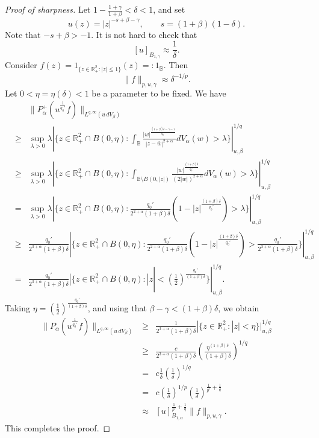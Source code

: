 \documentclass[a4paper,11pt,intlimits,oneside]{amsart}
\theoremstyle{definition}
\numberwithin{equation}{section}
\theoremstyle{definition}
\newcommand{\Beas}{\begin{eqnarray*}}
\newcommand{\Eeas}{\end{eqnarray*}}
\begin{document}
\begin{proof}[Proof of sharpness]
Let $1-\frac{1+\gamma}{1+\beta}<\delta<1$, and set $$u(z)=|z|^{-s+\beta-\gamma}, \qquad s=(1+\beta)(1-\delta).$$
Note that $-s+\beta>-1$. It is not hard to check that
$$[u]_{B_{1,\gamma}}\approx \frac{1}{\delta}.$$
Consider $f(z)=1_{\{z\in \mathbb{R}_+^2:|z|\leq 1\}}(z)=:1_{\mathbb{B}}$. Then
$$\|f\|_{p,u,\gamma}\approx \delta^{-1/p}.$$
Let $0<\eta=\eta(\delta)<1$ be a parameter to be fixed. We have
\Beas
&& \|P_{\alpha}^+(u^{\frac{1}{q_0'}}f)\|_{L^{q,\infty}(u\,{d}V_{\beta})}\\ &\ge& \sup_{\lambda>0}\lambda|\{z\in \mathbb{R}_+^2\cap B(0,\eta):\int_{\mathbb{B}}\frac{|w|^{\frac{(1+\beta)\delta-\gamma-1}{q_0'}}}{|z-\bar{w}|^{2+\alpha}}dV_\alpha(w)>\lambda\}|_{u,\beta}^{1/q}\\ &\ge&  \sup_{\lambda>0}\lambda|\{z\in \mathbb{R}_+^2\cap B(0,\eta):\int_{\mathbb{B}\setminus B(0,|z|)}\frac{|w|^{\frac{(1+\beta)\delta}{q_0'}}}{(2|{w}|)^{2+\alpha}}dV_\alpha(w)>\lambda\}|_{u,\beta}^{1/q}\\ &=& \sup_{\lambda>0}\lambda|\{z\in \mathbb{R}_+^2\cap B(0,\eta):\frac{q_0'}{2^{2+\alpha}(1+\beta)\delta}(1-|z|^{\frac{(1+\beta)\delta}{q_0'}})>\lambda\}|_{u,\beta}^{1/q}\\ &\ge& \frac{q_0'}{2^{3+\alpha}(1+\beta)\delta}|\{z\in \mathbb{R}_+^2\cap B(0,\eta):\frac{q_0'}{2^{2+\alpha}(1+\beta)\delta}(1-|z|^{\frac{(1+\beta)\delta}{q_0'}})>\frac{q_0'}{2^{3+\alpha}(1+\beta)\delta}\}|_{u,\beta}^{1/q}\\ &=& \frac{q_0'}{2^{3+\alpha}(1+\beta)\delta}|\{z\in \mathbb{R}_+^2\cap B(0,\eta):|z|<\left(\frac{1}{2}\right)^{\frac{q_0'}{(1+\beta)\delta}}\}|_{u,\beta}^{1/q}.
\Eeas
Taking $\eta=\left(\frac{1}{2}\right)^{\frac{q_0'}{(1+\beta)\delta}}$, and using that $\beta-\gamma<(1+\beta)\delta$, we obtain
\Beas\|P_{\alpha}(u^{\frac{1}{q_0'}}f)\|_{L^{q,\infty}(u\,{d}V_{\beta})} &\ge& \frac{1}{2^{3+\alpha}(1+\beta)\delta}|\{z\in \mathbb{R}_+^2: |z|<\eta\}|_{u,\beta}^{1/q}\\ &\geq&
\frac{c}{2^{3+\alpha}(1+\beta)\delta}\left(\frac{\eta^{(1+\beta)\delta}}{(1+\beta)\delta}\right)^{1/q}\\ &=& c\frac{1}{\delta}\left(\frac{1}{\delta}\right)^{1/q}\\
&=& c\left(\frac{1}{\delta}\right)^{1/p}\left(\frac{1}{\delta}\right)^{\frac{1}{p'}+\frac{1}{q}}\\ &\approx& [u]_{B_{1,\alpha}}^{\frac{1}{p'}+\frac{1}{q}}\|f\|_{p,u,\gamma}.
\Eeas
This completes the proof.
\end{proof}
\end{document}
